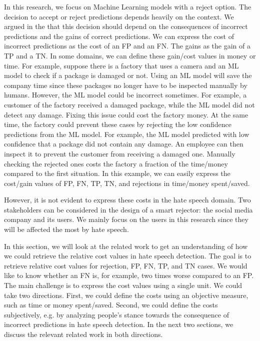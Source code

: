 In this research, we focus on Machine Learning models with a reject option. The decision to accept or reject predictions depends heavily on the context. We argued in the  that this decision should depend on the consequences of incorrect predictions and the gains of correct predictions. We can express the cost of incorrect predictions as the cost of an FP and an FN. The gains as the gain of a TP and a TN. In some domains, we can define these gain/cost values in money or time. For example, suppose there is a factory that uses a camera and an ML model to check if a package is damaged or not. Using an ML model will save the company time since these packages no longer have to be inspected manually by humans. However, the ML model could be incorrect sometimes. For example, a customer of the factory received a damaged package, while the ML model did not detect any damage. Fixing this issue could cost the factory money. At the same time, the factory could prevent these cases by rejecting the low confidence predictions from the ML model. For example, the ML model predicted with low confidence that a package did not contain any damage. An employee can then inspect it to prevent the customer from receiving a damaged one. Manually checking the rejected ones costs the factory a fraction of the time/money compared to the first situation. In this example, we can easily express the cost/gain values of FP, FN, TP, TN, and rejections in time/money spent/saved.

However, it is not evident to express these costs in the hate speech domain. Two stakeholders can be considered in the design of a smart rejector: the social media company and its users. We mainly focus on the users in this research since they will be affected the most by hate speech.

In this section, we will look at the related work to get an understanding of how we could retrieve the relative cost values in hate speech detection. The goal is to retrieve relative cost values for rejection, FP, FN, TP, and TN cases. We would like to know whether an FN is, for example, two times worse compared to an FP. The main challenge is to express the cost values using a single unit. We could take two directions. First, we could define the costs using an objective measure, such as time or money spent/saved. Second, we could define the costs subjectively, e.g. by analyzing people’s stance towards the consequence of incorrect predictions in hate speech detection. In the next two sections, we discuss the relevant related work in both directions.

